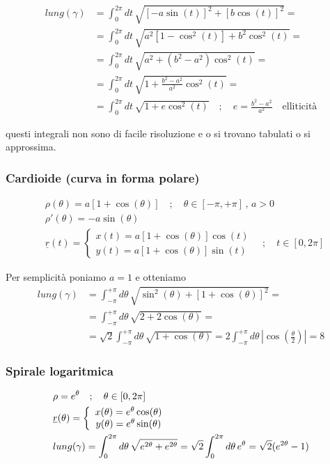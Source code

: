 \begin{align}
lung(\gamma) {}&= \int_{0}^{2\pi} dt \, \sqrt{[-a \sin(t)]^2 + [b \cos(t)]^2} = \nonumber \\
&= \int_{0}^{2\pi} dt \, \sqrt{a^2 [1-\cos^2(t)] + b^2 \cos^2(t)}  = \nonumber \\
&= \int_{0}^{2\pi} dt \, \sqrt{a^2 + (b^2-a^2)\cos^2(t)} = \nonumber \\
&= \int_{0}^{2\pi} dt \, \sqrt{1 + \frac{b^2-a^2}{a^2}\cos^2(t)} = \nonumber \\
&= \int_{0}^{2\pi} dt \, \sqrt{1 + e \cos^2(t)} \quad ; \quad e= \frac{b^2-a^2}{a^2} \quad \text{elliticità}
\end{align}

questi integrali non sono di facile risoluzione e o si trovano tabulati o si approssima.

\subsubsection{Cardioide (curva in forma polare)}

\begin{align}
{}&\rho(\theta)= a[1+\cos(\theta)] \quad ; \quad \theta \in [-\pi, +\pi] \, , \, a>0 \\
&\rho'(\theta)= - a \sin(\theta) \\
&\underline{r}(t)=\left\{
\begin{array}{cc}
x(t)= a[1+\cos(\theta)] \cos(t) \\
y(t)= a[1+\cos(\theta)] \sin(t)
\end{array}
\right. \quad ; \quad t \in [0,2\pi]
\end{align}

Per semplicità poniamo $a=1$ e otteniamo
\begin{align}
lung(\gamma){}&= \int_{-\pi}^{+\pi} d\theta \, \sqrt{\sin^2(\theta) + [1+\cos(\theta)]^2} = \nonumber \\
&= \int_{-\pi}^{+\pi} d\theta \, \sqrt{ 2 + 2 \cos(\theta)}= \nonumber \\
&=\sqrt{2} \int_{-\pi}^{+\pi} d\theta \, \sqrt{ 1 +  \cos(\theta)}= 2 \int_{-\pi}^{+\pi} d\theta \, \left|\cos\left(\frac{\theta}{2}\right)\right|=8
\end{align}


\subsubsection{Spirale logaritmica}
\begin{align}
{}&\rho = e^{\theta} \quad ; \quad \theta\in[0,2\pi]\\
&\underline{r}(\theta)=\left\{\begin{array}{cc} x(\theta)= e^{\theta}\cos(\theta)  \\ y(\theta) = e^{\theta}\sin (\theta) \end{array}\right.\\
& lung(\gamma)= \int_{0}^{2\pi}d\theta \, \sqrt{e^{2\theta} + e^{2\theta}} = \sqrt{2}\int_{0}^{2\pi}d\theta \, e^{\theta}= \sqrt{2}(e^{2\theta} -1)
\end{align}

